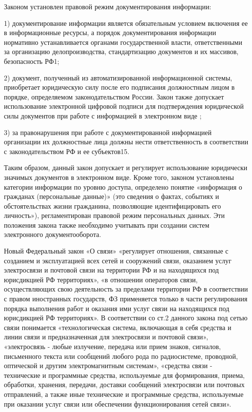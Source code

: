 Законом установлен правовой режим документирования информации:

1) документирование информации является обязательным условием включения ее в информационные ресурсы, а порядок документирования информации нормативно устанавливается органами государственной власти, ответственными за организацию делопроизводства, стандартизацию документов и их массивов, безопасность РФ1;

2) документ, полученный из автоматизированной информационной системы, приобретает юридическую силу после его подписания должностным лицом в порядке, определяемом законодательством России. Закон также допускает использование электронной цифровой подписи для подтверждения юридической силы документов при работе с информацией в электронном виде ;

3) за правонарушения при работе с документированной информацией организации их должностные лица должны нести ответственность в соответствии с законодательством РФ и ее субъектов15.

Таким образом, данный закон допускает и регулирует использование юридически значимых документов в электронном виде. Кроме того, законом установлены категории информации по уровню доступа, определено понятие «информация о гражданах (персональные данные)» (это сведения о фактах, событиях и обстоятельствах жизни гражданина, позволяющие идентифицировать его личность»), регламентирован правовой режим персональных данных. Эти положения закона также необходимо учитывать при создании систем электронного документооборота.

Новый Федеральный закон «О связи» \cite{svyazlaw} «регулирует отношения, связанные с созданием и эксплуатацией всех сетей и сооружений связи, оказанием услуг электросвязи и почтовой связи на территории РФ и на находящихся под юрисдикцией РФ территориях», «в отношении операторов связи, осуществляющих свою деятельность за пределами территории РФ в соответствии с правом иностранных государств, ФЗ применяется только в части регулирования порядка выполнения работ и оказания ими услуг связи на находящихся под юрисдикцией РФ территориях». В соответствии со ст.2 данного закона под сетью связи понимается «технологическая система, включающая в себя средства и линии связи и предназначенная для электросвязи и почтовой связи», «электросвязь - любые излучение, передача или прием знаков, сигналов, письменного текста или сообщений любого рода по радиосистеме, проводной, оптической и другим электромагнитным системам», «средства связи - технические и программные средства, используемые для формирования, приема, обработки, хранения, передачи, доставки сообщений электросвязи или почтовых отправлений, а также иные технические и программные средства, используемые при оказании услуг связи или обеспечении функционирования сетей связи».


